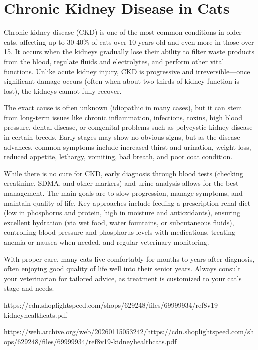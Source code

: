 \section{Chronic Kidney Disease in Cats}
Chronic kidney disease (CKD) is one of the most common conditions in older cats, affecting up to 30-40\% of cats over 10 years old and even more in those over 15. It occurs when the kidneys gradually lose their ability to filter waste products from the blood, regulate fluids and electrolytes, and perform other vital functions. Unlike acute kidney injury, CKD is progressive and irreversible—once significant damage occurs (often when about two-thirds of kidney function is lost), the kidneys cannot fully recover.

The exact cause is often unknown (idiopathic in many cases), but it can stem from long-term issues like chronic inflammation, infections, toxins, high blood pressure, dental disease, or congenital problems such as polycystic kidney disease in certain breeds. Early stages may show no obvious signs, but as the disease advances, common symptoms include increased thirst and urination, weight loss, reduced appetite, lethargy, vomiting, bad breath, and poor coat condition.

While there is no cure for CKD, early diagnosis through blood tests (checking creatinine, SDMA, and other markers) and urine analysis allows for the best management. The main goals are to slow progression, manage symptoms, and maintain quality of life. Key approaches include feeding a prescription renal diet (low in phosphorus and protein, high in moisture and antioxidants), ensuring excellent hydration (via wet food, water fountains, or subcutaneous fluids), controlling blood pressure and phosphorus levels with medications, treating anemia or nausea when needed, and regular veterinary monitoring.

With proper care, many cats live comfortably for months to years after diagnosis, often enjoying good quality of life well into their senior years. Always consult your veterinarian for tailored advice, as treatment is customized to your cat's stage and needs.

https://cdn.shoplightspeed.com/shops/629248/files/69999934/ref8v19-kidneyhealthcats.pdf



https://web.archive.org/web/20260115053242/https://cdn.shoplightspeed.com/shops/629248/files/69999934/ref8v19-kidneyhealthcats.pdf